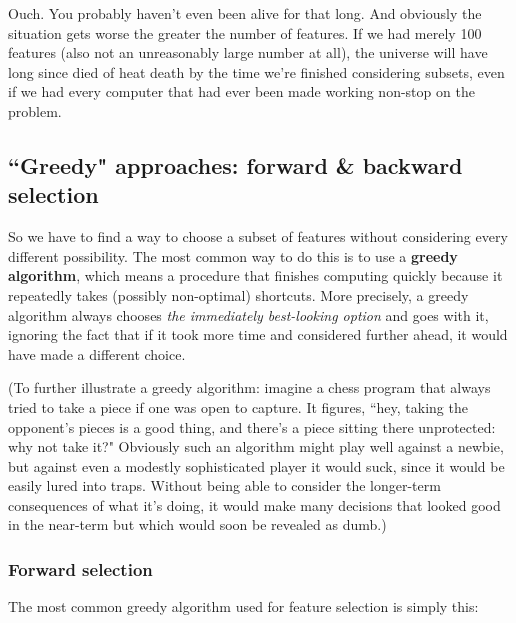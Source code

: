 \documentclass[12pt]{article}
\begin{document}
\normalsize
Ouch. You probably haven't even been alive for that long. And obviously the
situation gets worse the greater the number of features. If we had merely 100
features (also not an unreasonably large number at all), the universe will
have long since died of heat death by the time we're finished considering
subsets, even if we had every computer that had ever been made working
non-stop on the problem.

\subsection{``Greedy" approaches: forward \& backward selection}

So we have to find a way to choose a subset of features without considering
every different possibility. The most common way to do this is to use a
\textbf{greedy algorithm}, which means a procedure that finishes computing
quickly because it repeatedly takes (possibly non-optimal) shortcuts. More
precisely, a greedy algorithm always chooses \textit{the immediately
best-looking option} and goes with it, ignoring the fact that if it took more
time and considered further ahead, it would have made a different choice.

(To further illustrate a greedy algorithm: imagine a chess program that always
tried to take a piece if one was open to capture. It figures, ``hey, taking
the opponent's pieces is a good thing, and there's a piece sitting there
unprotected: why not take it?" Obviously such an algorithm might play well
against a newbie, but against even a modestly sophisticated player it would
suck, since it would be easily lured into traps. Without being able to
consider the longer-term consequences of what it's doing, it would make many
decisions that looked good in the near-term but which would soon be revealed
as dumb.)

\subsubsection{Forward selection}

The most common greedy algorithm used for feature selection is simply this:
\end{document}
